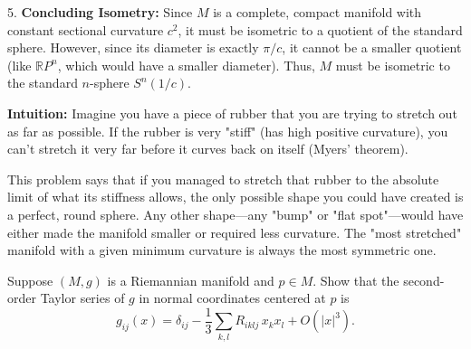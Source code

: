 \begin{solution}
5. \textbf{Concluding Isometry:}
Since $M$ is a complete, compact manifold with constant sectional curvature $c^2$, it must be isometric to a quotient of the standard sphere. However, since its diameter is exactly $\pi/c$, it cannot be a smaller quotient (like $\mathbb{R}P^n$, which would have a smaller diameter). Thus, $M$ must be isometric to the standard $n$-sphere $S^n(1/c)$.
\par\vspace{\baselineskip}

\textbf{Intuition:}
Imagine you have a piece of rubber that you are trying to stretch out as far as possible. If the rubber is very "stiff" (has high positive curvature), you can't stretch it very far before it curves back on itself (Myers' theorem). 
\par\vspace{\baselineskip}

This problem says that if you managed to stretch that rubber to the absolute limit of what its stiffness allows, the only possible shape you could have created is a perfect, round sphere. Any other shape—any "bump" or "flat spot"—would have either made the manifold smaller or required less curvature. The "most stretched" manifold with a given minimum curvature is always the most symmetric one.
\end{solution}

\begin{exercise}
\label{geometry:2015:6}
Suppose $(M, g)$ is a Riemannian manifold and $p \in M$. Show that the second-order Taylor series of $g$ in normal coordinates centered at $p$ is
\[ g_{ij}(x) = \delta_{ij} - \frac{1}{3}\sum_{k,l} R_{iklj}\,x_{k}x_{l} + O(|x|^{3}). \]
\end{exercise}

